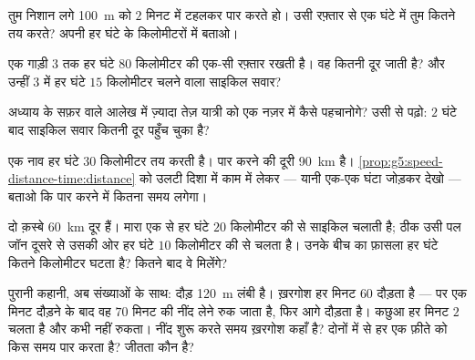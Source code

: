 \begin{exercise}[$\star$]\label{exo:g5:speed-distance-time:6}
तुम निशान लगे \qty{100}{m} को $2$ मिनट में टहलकर पार करते हो। उसी
रफ़्तार से एक घंटे में तुम कितने  तय करते? अपनी  हर घंटे के
किलोमीटरों में बताओ।
\end{exercise}

\begin{exercise}[$\star$]\label{exo:g5:speed-distance-time:7}
एक गाड़ी $3$  तक हर घंटे $80$ किलोमीटर की एक-सी रफ़्तार रखती है।
वह कितनी दूर जाती है? और उन्हीं $3$  में हर घंटे $15$ किलोमीटर
चलने वाला साइकिल सवार?
\end{exercise}

\begin{exercise}[$\star$]\label{exo:g5:speed-distance-time:8}
अध्याय के सफ़र वाले आलेख में ज़्यादा तेज़ यात्री को एक नज़र में कैसे
पहचानोगे? उसी से पढ़ो: $2$ घंटे बाद साइकिल सवार कितनी दूर पहुँच चुका
है?
\end{exercise}

\begin{exercise}[$\star\star$]\label{exo:g5:speed-distance-time:9}
एक नाव हर घंटे $30$ किलोमीटर तय करती है। पार करने की दूरी
\qty{90}{km} है। \cref{prop:g5:speed-distance-time:distance} को
उलटी दिशा में काम में लेकर --- यानी एक-एक घंटा जोड़कर देखो ---
बताओ कि पार करने में कितना समय लगेगा।
\end{exercise}

\begin{exercise}[$\star\star$]\label{exo:g5:speed-distance-time:10}
दो क़स्बे \qty{60}{km} दूर हैं। मारा एक से हर घंटे $20$ किलोमीटर की
 से साइकिल चलाती है; ठीक उसी पल जॉन दूसरे से उसकी ओर हर घंटे $10$
किलोमीटर की  से चलता है। उनके बीच का फ़ासला हर घंटे कितने किलोमीटर
घटता है? कितने  बाद वे मिलेंगे?
\end{exercise}

\begin{exercise}[$\star\star$]\label{exo:g5:speed-distance-time:11}
पुरानी कहानी, अब संख्याओं के साथ: दौड़ \qty{120}{m} लंबी है। ख़रगोश
हर मिनट $60$  दौड़ता है --- पर एक मिनट दौड़ने के बाद वह $70$ मिनट
की नींद लेने रुक जाता है, फिर आगे दौड़ता है। कछुआ हर मिनट $2$ 
चलता है और कभी नहीं रुकता। नींद शुरू करते समय ख़रगोश कहाँ है? दोनों
में से हर एक फ़ीते को किस समय पार करता है? जीतता कौन है?
\end{exercise}
